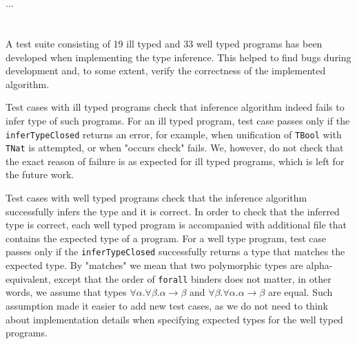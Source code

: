
\section{}

...


\section{}

A test suite consisting of 19 ill typed and 33 well typed programs has been developed when implementing the type inference. This helped to find bugs during development and, to some extent, verify the correctness of the implemented algorithm.

Test cases with ill typed programs check that inference algorithm indeed fails to infer type of such programs. For an ill typed program, test case passes only if the \texttt{inferTypeClosed} returns an error, for example, when unification of \texttt{TBool} with \texttt{TNat} is attempted, or when "occurs check" fails. We, however, do not check that the exact reason of failure is as expected for ill typed programs, which is left for the future work.

Test cases with well typed programs check that the inference algorithm successfully infers the type and it is correct. In order to check that the inferred type is correct, each well typed program is accompanied with additional file that contains the expected type of a program. For a well type program, test case passes only if the \texttt{inferTypeClosed} successfully returns a type that matches the expected type. By "matches" we mean that two polymorphic types are alpha-equivalent, except that the order of \texttt{forall} binders does not matter, in other words, we assume that types $\forall \alpha. \forall \beta. \alpha \to \beta$ and $\forall \beta. \forall \alpha. \alpha \to \beta$ are equal. Such assumption made it easier to add new test cases, as we do not need to think about implementation details when specifying expected types for the well typed programs.

